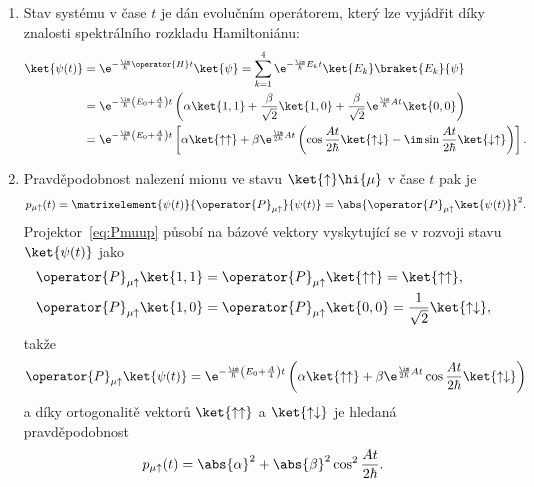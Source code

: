 \begin{solution}
\begin{enumerate}
	\item
		Stav systému v čase $t$ je dán evolučním operátorem, který lze vyjádřit díky znalosti spektrálního rozkladu Hamiltoniánu:
		\begin{align}
			\ket{\psi(t)}
				&=\e^{-\frac{\im}{\hbar}\operator{H}t}\ket{\psi}
				 =\sum_{k=1}^{4}\e^{-\frac{\im}{\hbar}E_{k}t}\ket{E_{k}}\braket{E_{k}}{\psi}\nonumber\\
				&=\e^{-\frac{\im}{\hbar}\left(E_{0}+\frac{A}{4}\right)t}
					\left(\alpha\ket{1,1}+\frac{\beta}{\sqrt{2}}\ket{1,0}
						+\frac{\beta}{\sqrt{2}}\e^{\frac{\im}{\hbar}At}\ket{0,0}\right)\nonumber\\
				&=\e^{-\frac{\im}{\hbar}\left(E_{0}+\frac{A}{4}\right)t}\left[\alpha\ket{\uparrow\uparrow}
					+\beta\e^{\frac{\im}{2\hbar}At}\left(\cos{\frac{At}{2\hbar}}\ket{\uparrow\downarrow}-\im\sin{\frac{At}{2\hbar}}\ket{\downarrow\uparrow}\right)\right].
		\end{align}
	
	\item
		Pravděpodobnost nalezení mionu ve stavu $\ket{\uparrow}\hi{\mu}$ v čase $t$ pak je
		\begin{equation}
			p_{\mu\uparrow}(t)
				=\matrixelement{\psi(t)}{\operator{P}_{\mu\uparrow}}{\psi(t)}
				=\abs{\operator{P}_{\mu\uparrow}\ket{\psi(t)}}^{2}.
		\end{equation}
		Projektor~\eqref{eq:Pmuup} působí na bázové vektory vyskytující se v rozvoji stavu $\ket{\psi(t)}$ jako
		\begin{subequations}
			\begin{align}
				\operator{P}_{\mu\uparrow}\ket{1,1}
					&=\operator{P}_{\mu\uparrow}\ket{\uparrow\uparrow}=\ket{\uparrow\uparrow},\\
				\operator{P}_{\mu\uparrow}\ket{1,0}
					&=\operator{P}_{\mu\uparrow}\ket{0,0}=\frac{1}{\sqrt{2}}\ket{\uparrow\downarrow},
			\end{align}				
		\end{subequations}
		takže
		\begin{equation}
			\operator{P}_{\mu\uparrow}\ket{\psi(t)}
				=\e^{-\frac{\im}{\hbar}\left(E_{0}+\frac{A}{4}\right)t}
					\left(\alpha\ket{\uparrow\uparrow}+\beta\e^{\frac{\im}{2\hbar}At}\cos\frac{At}{2\hbar}\ket{\uparrow\downarrow}\right)
		\end{equation}
		a díky ortogonalitě vektorů $\ket{\uparrow\uparrow}$ a $\ket{\uparrow\downarrow}$ je hledaná pravděpodobnost
		\begin{equation}
			p_{\mu\uparrow}(t)=\abs{\alpha}^{2}+\abs{\beta}^{2}\cos^{2}\frac{At}{2\hbar}.
		\end{equation}	
			

\end{enumerate}
\end{solution}
